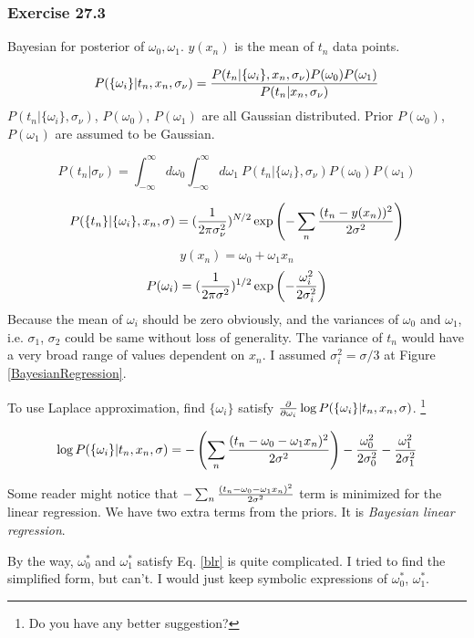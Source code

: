 \documentclass[a4paper,11pt]{article}
\numberwithin{equation}{section}
\begin{document}
{\subsubsection{Exercise 27.3}

Bayesian for posterior of $\omega_0, \omega_1$. $y(x_n)$ is the mean of $t_n$ data points. 

$$
P(\{\omega_i\}|t_n,x_n, \sigma_{\nu})= { P(t_n|\{\omega_i\},x_n,\sigma_{\nu})P(\omega_0)P(\omega_1)\over P(t_n|x_n,\sigma_{\nu})}
$$
$P(t_n|\{\omega_i\},\sigma_{\nu})$, $P(\omega_0)$, $P(\omega_1)$ are all Gaussian distributed. Prior $P(\omega_0)$, $P(\omega_1)$ are assumed to be Gaussian. 

$$
P(t_n|\sigma_{\nu})= \int^{\infty}_{-\infty} d\omega_0 \int^{\infty}_{-\infty} d\omega_1~ P(t_n|\{\omega_i\},\sigma_{\nu})P(\omega_0)P(\omega_1)
$$

$$
P(\{t_n\}|\{\omega_i\},x_n,\sigma) = ({1 \over 2\pi \sigma^2_{\nu}})^{N/2}  \exp\left(-\sum_n {(t_n-y(x_n))^2 \over 2\sigma^2}\right)
$$
$$
y(x_n)=\omega_0 + \omega_1 x_n
$$
$$
P(\omega_i)=  ({1 \over 2\pi \sigma^2})^{1/2}  \exp\left(-{\omega_i^2 \over 2\sigma_i^2}\right)
$$
Because the mean of $\omega_i$ should be zero obviously, and the variances of $\omega_0$ and $\omega_1$, i.e. $\sigma_1$, $\sigma_2$ could be same without loss of generality. The variance of $t_n$ would have a very broad range of values dependent on $x_n$. I assumed $\sigma_i^2 = \sigma/3$ at Figure \ref{BayesianRegression}.  

To use Laplace approximation, find $\{\omega_i\}$ satisfy ${\partial \over \partial \omega_i}\log P(\{\omega_i\}|t_n,x_n, \sigma)$. \footnote{Do you have any better suggestion?}

\begin{equation}\label{blr}
\log P(\{\omega_i\}|t_n,x_n, \sigma) = -\left(\sum_n {(t_n-\omega_0 - \omega_1 x_n)^2 \over 2\sigma^2}\right)-{\omega_0^2 \over 2\sigma_0^2}-{\omega_1^2 \over 2\sigma_1^2}
\end{equation}

Some reader might notice that $-\sum_n {(t_n-\omega_0 - \omega_1 x_n)^2 \over 2\sigma^2}$ term is minimized for the linear regression. We have two extra terms from the priors. It is {\it Bayesian linear regression}.  

By the way, $\omega_0^*$ and $\omega_1^*$ satisfy Eq. \ref{blr} is quite complicated. I tried to find the simplified form, but can't. I would just keep symbolic expressions of $\omega_0^*$, $\omega_1^*$. 


}
\end{document}
